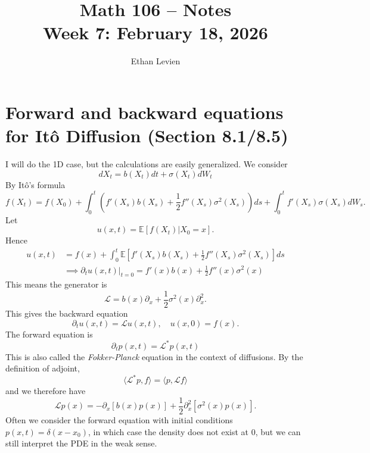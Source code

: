 \documentclass[11pt]{article}
\title{Math 106 -- Notes \\ Week 7: February 18, 2026}
\author{Ethan Levien}
\date{}
\begin{document}
\maketitle


\section*{Forward and backward equations for It\^o Diffusion (Section 8.1/8.5)}
I will do the 1D case, but the calculations are easily generalized. We consider
\begin{equation}
dX_t = b(X_t)dt + \sigma(X_t)dW_t
\end{equation}
By It\^o's formula
\begin{equation}
f(X_t) = f(X_0) + \int_0^t(f'(X_s)b(X_s) + \frac{1}{2}f''(X_s)\sigma^2(X_s))ds + \int_0^tf'(X_s)\sigma(X_s)dW_s.
\end{equation}
Let
\begin{equation}
u(x,t) = {\mathbb E}[f(X_t)|X_0=x].
\end{equation}
Hence
\begin{align}
u(x,t) &= f(x) +  \int_0^t{\mathbb E}[f'(X_s)b(X_s) + \frac{1}{2}f''(X_s)\sigma^2(X_s)]ds\\
& \implies \partial_t u(x,t)\Big|_{t=0} = f'(x)b(x) + \frac{1}{2}f''(x)\sigma^2(x)
\end{align}
This means the generator is 
\begin{equation}
{\mathcal L} = b(x)\partial_x + \frac{1}{2}\sigma^2(x)\partial_x^2.
\end{equation}
This gives the backward equation
\begin{equation}
\partial_t u(x,t) = {\mathcal L} u(x,t),\quad u(x,0) = f(x).
\end{equation}
The forward equation is 
\begin{equation}
\partial_t p(x,t) = {\mathcal L}^* p(x,t)
\end{equation}
This is also called the \emph{Fokker-Planck} equation in the context of diffusions. 
By the definition of adjoint,
\begin{equation}
\langle  {\mathcal L}^*p,f \rangle = \langle p,  {\mathcal L}f \rangle
\end{equation}
and we therefore have
\begin{equation}
{\mathcal L}p(x) =-\partial_x[ b(x)p(x)] + \frac{1}{2}\partial_x^2[\sigma^2(x)p(x)].
\end{equation}
Often we consider the forward equation with initial conditions $p(x,t) = \delta(x-x_0)$, in which case the density does not exist at $0$, but we can still interpret the PDE in the weak sense. 
\end{document}
